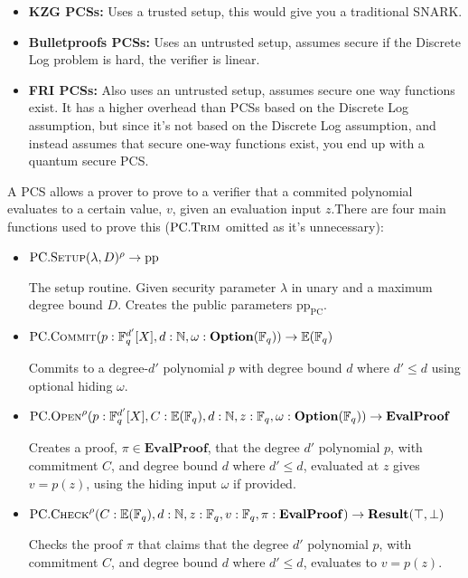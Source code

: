 \documentclass[
]{article}
\providecommand{\tightlist}{%
  \setlength{\itemsep}{0pt}\setlength{\parskip}{0pt}}
\newcommand*\Fb{\mathbb{F}}
\newcommand*\Nb{\mathbb{N}}
\newcommand*\Eb{\mathbb{E}}
\renewcommand*\l{\lambda}
\renewcommand*\o{\omega}
\newcommand*{\pp}{\mathrm{pp}}
\newcommand*{\Setup}{\mathrm{\text{S{\scriptsize ETUP}}}}
\newcommand*{\Trim}{\mathrm{\text{T{\scriptsize RIM}}}}
\newcommand*{\Commit}{\mathrm{\text{C{\scriptsize OMMIT}}}}
\newcommand*{\PC}{\text{PC}}
\newcommand*{\PCSetup}{\PC.\Setup}
\newcommand*{\PCTrim}{\PC.\Trim}
\newcommand*{\PCCommit}{\PC.\Commit}
\newcommand*{\PCOpen}{\PC.\mathrm{\text{O\scriptsize PEN}}}
\newcommand*{\PCCheck}{\PC.\mathrm{\text{C\scriptsize HECK}}}
\newcommand*\Result{\mathbf{Result}}
\newcommand*\Option{\mathbf{Option}}
\newcommand*\EvalProof{\mathbf{EvalProof}}
\begin{document}
\begin{itemize}
\tightlist
\item
  \textbf{KZG PCSs:} Uses a trusted setup, this would give you a
  traditional SNARK.
\item
  \textbf{Bulletproofs PCSs:} Uses an untrusted setup, assumes secure if
  the Discrete Log problem is hard, the verifier is linear.
\item
  \textbf{FRI PCSs:} Also uses an untrusted setup, assumes secure one
  way functions exist. It has a higher overhead than PCSs based on the
  Discrete Log assumption, but since it's not based on the Discrete Log
  assumption, and instead assumes that secure one-way functions exist,
  you end up with a quantum secure PCS.
\end{itemize}

A PCS allows a prover to prove to a verifier that a commited polynomial
evaluates to a certain value, \(v\), given an evaluation input
\(z\).There are four main functions used to prove this (\(\PCTrim\)
omitted as it's unnecessary):

\begin{itemize}
\item
  \(\PCSetup(\l, D)^\rho \to \pp\)

  The setup routine. Given security parameter \(\l\) in unary and a
  maximum degree bound \(D\). Creates the public parameters \(\pp_\PC\).
\item
  \(\PCCommit(p: \Fb^{d'}_q[X], d: \Nb, \o: \Option(\Fb_q)) \to \Eb(\Fb_q)\)

  Commits to a degree-\(d'\) polynomial \(p\) with degree bound \(d\)
  where \(d'
  \leq d\) using optional hiding \(\o\).
\item
  \(\PCOpen^\rho(p: \Fb^{d'}_q[X], C: \Eb(\Fb_q), d: \Nb, z: \Fb_q, \o: \Option(\Fb_q)) \to \EvalProof\)

  Creates a proof, \(\pi \in \EvalProof\), that the degree \(d'\)
  polynomial \(p\), with commitment \(C\), and degree bound \(d\) where
  \(d' \leq d\), evaluated at \(z\) gives \(v = p(z)\), using the hiding
  input \(\o\) if provided.
\item
  \(\PCCheck^\rho(C: \Eb(\Fb_q), d: \Nb, z: \Fb_q, v: \Fb_q, \pi: \EvalProof) \to \Result(\top, \bot)\)

  Checks the proof \(\pi\) that claims that the degree \(d'\) polynomial
  \(p\), with commitment \(C\), and degree bound \(d\) where
  \(d' \leq d\), evaluates to \(v = p(z)\).
\end{itemize}
\end{document}
